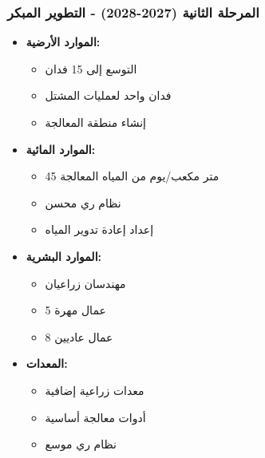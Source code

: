 \subsubsection{المرحلة الثانية (2027-2028) - التطوير المبكر}
\begin{itemize}
    \item \textbf{الموارد الأرضية:}
    \begin{itemize}
        \item التوسع إلى 15 فدان
        \item فدان واحد لعمليات المشتل
        \item إنشاء منطقة المعالجة
    \end{itemize}
    \item \textbf{الموارد المائية:}
    \begin{itemize}
        \item 45 متر مكعب/يوم من المياه المعالجة
        \item نظام ري محسن
        \item إعداد إعادة تدوير المياه
    \end{itemize}
    \item \textbf{الموارد البشرية:}
    \begin{itemize}
        \item مهندسان زراعيان
        \item 5 عمال مهرة
        \item 8 عمال عاديين
    \end{itemize}
    \item \textbf{المعدات:}
    \begin{itemize}
        \item معدات زراعية إضافية
        \item أدوات معالجة أساسية
        \item نظام ري موسع
    \end{itemize}
\end{itemize}

